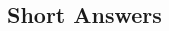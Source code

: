 \begin{comment}
\end{example}

\vspace{1 in}


\begin{example}
Evaluate the following limit: \( \lim\limits_{x \to \infty} \displaystyle\left(\frac{1000x}{x^2-2000}\right)\) 
    \begin{sol}
    0
    \end{sol}
    \begin{solL}
    solution
    \end{solL}

\end{example}

\vspace{1 in}


\begin{example}
Evaluate the following limit: \( \lim\limits_{x \to \infty} \displaystyle\left(\frac{1}{x}-5\right)\) 
    \begin{sol}
    -5
    \end{sol}
    \begin{solL}
    solution
    \end{solL}

\end{example}

\vspace{1 in}
\end{comment}
\subsection*{Short Answers}
\begin{multicols}{4}

\end{multicols}
\newpage


